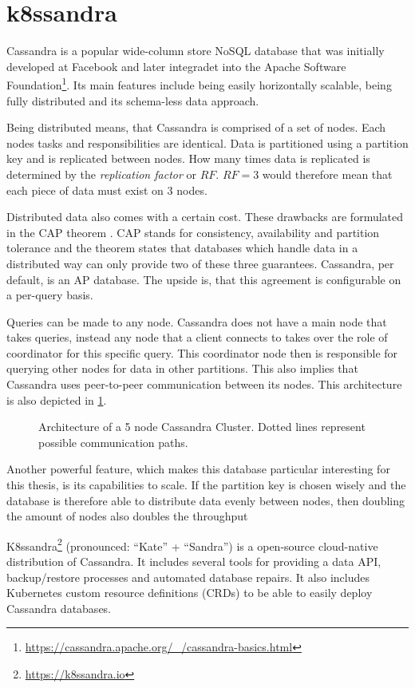 \section{k8ssandra}
\label{sec:k8ssandra}

Cassandra is a popular wide-column store NoSQL database that was initially developed at Facebook and later integradet into the Apache Software Foundation\footnote{\url{https://cassandra.apache.org/_/cassandra-basics.html}\label{fn:cassandra-basics}}. Its main features include being easily horizontally scalable, being fully distributed and its schema-less data approach.

Being distributed means, that Cassandra is comprised of a set of nodes. Each nodes tasks and responsibilities are identical. Data is partitioned using a partition key and is replicated between nodes. How many times data is replicated is determined by the \textit{replication factor} or \(RF\). \(RF = 3\) would therefore mean that each piece of data must exist on 3 nodes.

Distributed data also comes with a certain cost. These drawbacks are formulated in the CAP theorem \cite{foxHarvestYieldScalable1999a}. CAP stands for consistency, availability and partition tolerance and the theorem states that databases which handle data in a distributed way can only provide two of these three guarantees. Cassandra, per default, is an AP database. The upside is, that this agreement is configurable on a per-query basis.

Queries can be made to any node. Cassandra does not have a main node that takes queries, instead any node that a client connects to takes over the role of coordinator for this specific query. This coordinator node then is responsible for querying other nodes for data in other partitions. This also implies that Cassandra uses peer-to-peer communication between its nodes. This architecture is also depicted in \cref{fig:cassandra-architecture}.

\begin{figure}
    \centering
    \caption{Architecture of a 5 node Cassandra Cluster. Dotted lines represent possible communication paths.}
    \label{fig:cassandra-architecture}
\end{figure}

Another powerful feature, which makes this database particular interesting for this thesis, is its capabilities to scale. If the partition key is chosen wisely and the database is therefore able to distribute data evenly between nodes, then doubling the amount of nodes also doubles the throughput 

K8ssandra\footnote{\url{https://k8ssandra.io}} (pronounced: ``Kate'' +  ``Sandra'') is a open-source cloud-native distribution of Cassandra. It includes several tools for providing a data API, backup/restore processes and automated database repairs. It also includes Kubernetes custom resource definitions (CRDs) to be able to easily deploy Cassandra databases.
